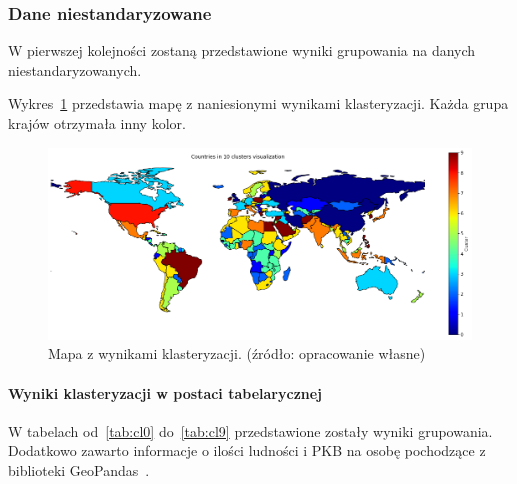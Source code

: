 \documentclass[11pt]{report}
\begin{document}
    \subsubsection{Dane niestandaryzowane}
    W pierwszej kolejności zostaną przedstawione wyniki grupowania na danych niestandaryzowanych.

    Wykres~\ref{fig:clust10} przedstawia mapę z naniesionymi wynikami klasteryzacji. Każda grupa krajów otrzymała inny kolor.

    \begin{figure}[ht!]
        \centering
        \includegraphics[width=1 \textwidth]{fig/CLUST/10clusterMap.png}
        \caption{Mapa z wynikami klasteryzacji. (źródło: opracowanie własne)}
        \label{fig:clust10}
    \end{figure}

    \paragraph{Wyniki klasteryzacji w postaci tabelarycznej}
    W tabelach od~\ref{tab:cl0} do~\ref{tab:cl9} przedstawione zostały wyniki grupowania.
    Dodatkowo zawarto informacje o ilości ludności i PKB na osobę pochodzące z biblioteki GeoPandas~\cite{geopandas}.
\end{document}
